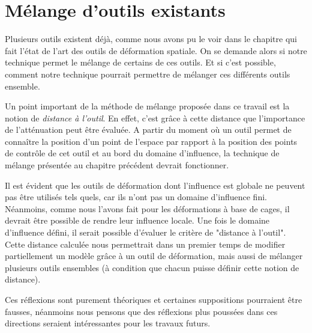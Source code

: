 \section{Mélange d'outils existants}

Plusieurs outils existent déjà, comme nous avons pu le voir dans le chapitre
qui fait l'état de l'art des outils de déformation spatiale. On se demande
alors si notre technique permet le mélange de certains de ces outils. Et si
c'est possible, comment notre technique pourrait permettre de mélanger ces
différents outils ensemble.

Un point important de la méthode de mélange proposée dans ce travail est la
notion de \textit{distance à l'outil}. En effet, c'est grâce à cette distance
que l'importance de l'atténuation peut être évaluée. A partir du moment où un
outil permet de connaître la position d'un point de l'espace par rapport à la
position des points de contrôle de cet outil et au bord du domaine
d'influence, la technique de mélange présentée au chapitre précédent devrait
fonctionner.

Il est évident que les outils de déformation dont l'influence est globale ne
peuvent pas être utilisés tels quels, car ils n'ont pas un domaine d'influence
fini. Néanmoins, comme nous l'avons fait pour les déformations à base de
cages, il devrait être possible de rendre leur influence locale. Une fois le
domaine d'influence défini, il serait possible d'évaluer le critère de
"distance à l'outil". Cette distance calculée nous permettrait dans un premier
temps de modifier partiellement un modèle grâce à un outil de déformation,
mais aussi de mélanger plusieurs outils ensembles (à condition que chacun
puisse définir cette notion de distance).

Ces réflexions sont purement théoriques et certaines suppositions pourraient
être fausses, néanmoins nous pensons que des réflexions plus poussées dans ces
directions seraient intéressantes pour les travaux futurs.

